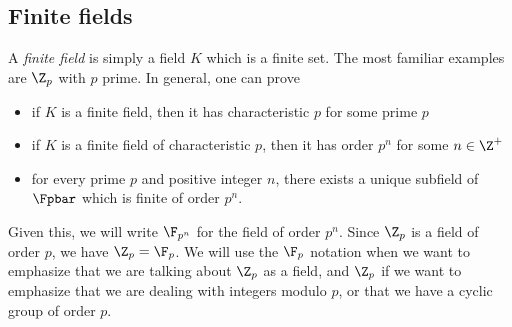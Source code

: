 \documentclass[12pt]{amsart}
\newcommand{\terminology}[1]{\textbf{\textit{#1}}}
\renewcommand{\terminology}[1]{#1}
\newcommand{\term}{\terminology}
\theoremstyle{plain}
\theoremstyle{definition}
\theoremstyle{remark}
\begin{document}



\subsection{Finite fields}

A \emph{finite field} is simply a field $K$ which is a finite set.
The most familiar examples are $\Z_p$ with $p$ prime.  In general,
one can prove
\begin{itemize}
\item if $K$ is a finite field, then it has characteristic $p$
 for some prime $p$
\item if $K$ is a finite field of characteristic $p$, then it
has order $p^n$ for some $n\in\Z^+$
\item for every prime $p$ and positive integer $n$, there exists a
  unique subfield of $\Fpbar$ which is finite of order $p^n$.
\end{itemize}
Given this, we will write $\F_{p^n}$ for the field of order $p^n$.
Since $\Z_p$ is a field of order $p$, we have $\Z_p=\F_p$.  We will
use the $\F_p$ notation when we want to emphasize that we are talking
about $\Z_p$ as a field, and $\Z_p$ if we want to emphasize that we
are dealing with integers modulo $p$, or that we have a cyclic group
of order $p$.
\end{document}
